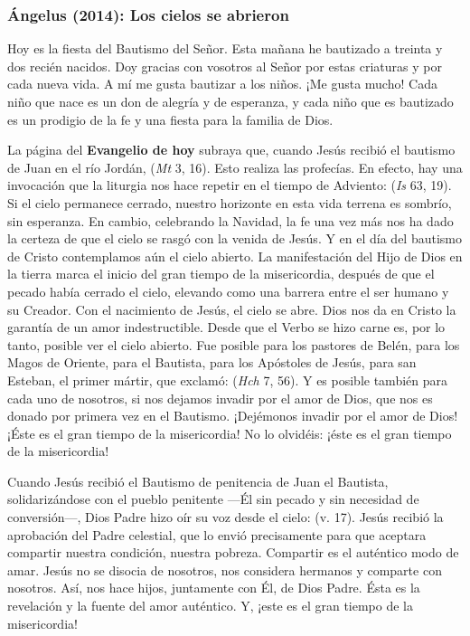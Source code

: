 		\subsubsection{Ángelus (2014): Los cielos se abrieron}
		
			
			\begin{body}
				Hoy es la fiesta del Bautismo del Señor. Esta mañana he bautizado a treinta y dos recién nacidos. Doy gracias con vosotros al Señor por estas criaturas y por cada nueva vida. A mí me gusta bautizar a los niños. ¡Me gusta mucho! Cada niño que nace es un don de alegría y de esperanza, y cada niño que es bautizado es un prodigio de la fe y una fiesta para la familia de Dios.
				
				La página del \textbf{Evangelio de hoy} subraya que, cuando Jesús recibió el bautismo de Juan en el río Jordán,  (\emph{Mt} 3, 16). Esto realiza las profecías. En efecto, hay una invocación que la liturgia nos hace repetir en el tiempo de Adviento:  (\emph{Is} 63, 19). Si el cielo permanece cerrado, nuestro horizonte en esta vida terrena es sombrío, sin esperanza. En cambio, celebrando la Navidad, la fe una vez más nos ha dado la certeza de que el cielo se rasgó con la venida de Jesús. Y en el día del bautismo de Cristo contemplamos aún el cielo abierto. La manifestación del Hijo de Dios en la tierra marca el inicio del gran tiempo de la misericordia, después de que el pecado había cerrado el cielo, elevando como una barrera entre el ser humano y su Creador. Con el nacimiento de Jesús, el cielo se abre. Dios nos da en Cristo la garantía de un amor indestructible. Desde que el Verbo se hizo carne es, por lo tanto, posible ver el cielo abierto. Fue posible para los pastores de Belén, para los Magos de Oriente, para el Bautista, para los Apóstoles de Jesús, para san Esteban, el primer mártir, que exclamó:  (\emph{Hch} 7, 56). Y es posible también para cada uno de nosotros, si nos dejamos invadir por el amor de Dios, que nos es donado por primera vez en el Bautismo. ¡Dejémonos invadir por el amor de Dios! ¡Éste es el gran tiempo de la misericordia! No lo olvidéis: ¡éste es el gran tiempo de la misericordia!
				
				Cuando Jesús recibió el Bautismo de penitencia de Juan el Bautista, solidarizándose con el pueblo penitente ---Él sin pecado y sin necesidad de conversión---, Dios Padre hizo oír su voz desde el cielo:  (v. 17). Jesús recibió la aprobación del Padre celestial, que lo envió precisamente para que aceptara compartir nuestra condición, nuestra pobreza. Compartir es el auténtico modo de amar. Jesús no se disocia de nosotros, nos considera hermanos y comparte con nosotros. Así, nos hace hijos, juntamente con Él, de Dios Padre. Ésta es la revelación y la fuente del amor auténtico. Y, ¡este es el gran tiempo de la misericordia!
				

\end{body}
